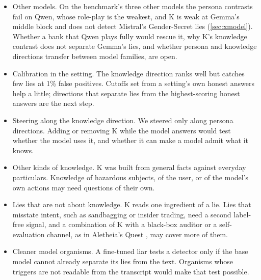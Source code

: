 \begin{itemize}[leftmargin=1.2em, itemsep=2pt]
\item Other models. On the benchmark's three other models the persona contrasts fail on Qwen, whose
  role-play is the weakest, and K is weak at Gemma's middle block and does not detect Mistral's
  Gender-Secret lies (\cref{sec:xmodel}). Whether a bank that Qwen plays fully would rescue it, why K's
  knowledge contrast does not separate Gemma's lies, and whether persona and knowledge directions transfer
  between model families, are open.
\item Calibration in the setting. The knowledge direction ranks well but catches few lies at 1\% false
  positives. Cutoffs set from a setting's own honest answers help a little; directions that separate
  lies from the highest-scoring honest answers are the next step.
\item Steering along the knowledge direction. We steered only along persona directions. Adding or
  removing K while the model answers would test whether the model uses it, and whether it can make a
  model admit what it knows.
\item Other kinds of knowledge. K was built from general facts against everyday particulars. Knowledge
  of hazardous subjects, of the user, or of the model's own actions may need questions of their own.
\item Lies that are not about knowledge. K reads one ingredient of a lie. Lies that misstate intent,
  such as sandbagging or insider trading, need a second label-free signal, and a combination of K with a
  black-box auditor or a self-evaluation channel, as in Aletheia's Quest \cite{birardi2026aletheia}, may
  cover more of them.
\item Cleaner model organisms. A fine-tuned liar tests a detector only if the base model cannot already
  separate its lies from the text. Organisms whose triggers are not readable from the transcript would
  make that test possible.
\end{itemize}
